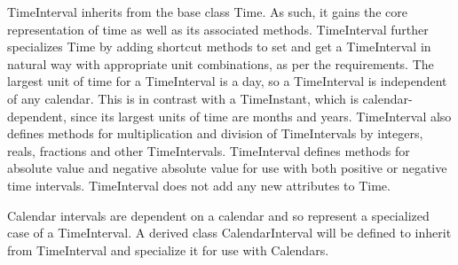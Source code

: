 
TimeInterval inherits from the base class Time.  As such, it gains the core
representation of time as well as its associated methods.   TimeInterval
further specializes Time by adding shortcut methods to set and get a
TimeInterval in natural way with appropriate unit combinations, as per the
requirements.  The largest unit of time for a TimeInterval is a day, so a
TimeInterval is independent of any calendar.  This is in contrast with a
TimeInstant, which is calendar-dependent, since its largest units of time
are months and years.  TimeInterval also defines methods for multiplication
and division of TimeIntervals by integers, reals, fractions and other
TimeIntervals.  TimeInterval defines methods for absolute value and negative
absolute value for use with both positive or negative time intervals.  
TimeInterval does not add any new attributes to Time.

Calendar intervals are dependent on a calendar and so represent a specialized
case of a TimeInterval.  A derived class CalendarInterval will be defined to
inherit from TimeInterval and specialize it for use with Calendars.
